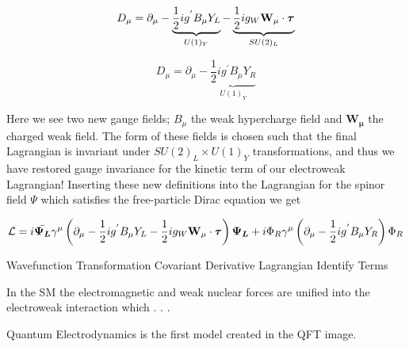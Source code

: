 \begin{equation} \label{eq:qed:left} 
D_\mu = \partial_{\mu}
- \underbrace{\frac{1}{2}ig^{'}B_{\mu}Y_{L}}_{U(1)_Y} -
  \underbrace{\frac{1}{2}ig_{W}\bf{W}_\mu \cdot \boldsymbol{\tau}}_{SU(2)_L}
\end{equation}

\begin{equation} \label{eq:qed:right} 
D_\mu = \partial_{\mu}  - \underbrace{\frac{1}{2}ig^{'}B_{\mu}Y_{R}}_{U(1)_Y} 
\end{equation}

Here we see two new gauge fields; $B_\mu$ the weak hypercharge field and
$\boldsymbol{W_\mu}$ the charged weak field.  The form of these fields is chosen
such that the final Lagrangian is invariant under $SU(2)_L \times U(1)_Y$
transformations, and thus we have restored gauge invariance for the kinetic term
of our electroweak Lagrangian!  Inserting these new definitions into the
Lagrangian for the spinor field $\Psi$ which satisfies the free-particle Dirac
equation we get

\begin{equation} \label{eq:qed:lagrangian}
\mathcal{L} = i\bar{\boldsymbol{\Psi_L}}\gamma^{\mu} \left( \partial_{\mu}
- \frac{1}{2}ig^{'}B_{\mu}Y_{L} - \frac{1}{2}ig_{W}\bf{W}_\mu \cdot
  \boldsymbol{\tau} \right) \boldsymbol{\Psi_L} + i \Phi_{R}\gamma^{\mu}
\left(\partial_{\mu} - \frac{1}{2}ig^{'}B_{\mu}Y_{R} \right) \Phi_{R}
\end{equation}

Wavefunction
Transformation
Covariant Derivative
Lagrangian
Identify Terms

In the SM the electromagnetic and weak nuclear forces are unified into the
electroweak interaction which . . . 

Quantum Electrodynamics is the first model created in the QFT image.
